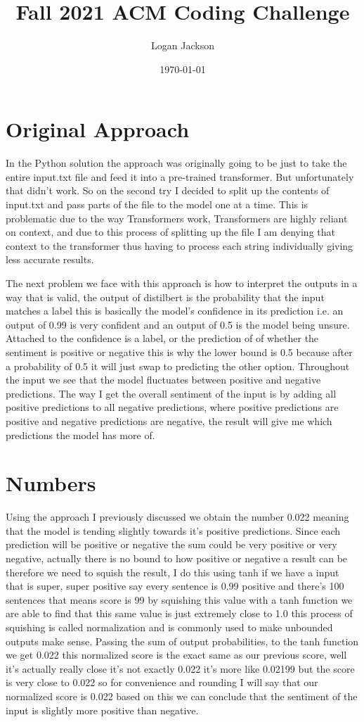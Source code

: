 \documentclass[12pt]{article}
\title{Fall 2021 ACM Coding Challenge}
\author{Logan Jackson}
\date{\today}
\begin{document}
\maketitle{}

\newpage
\section{Original Approach}
In the Python solution the approach was originally going to be just to take the entire input.txt file and feed it into a pre-trained transformer. But unfortunately that didn't work. So on the second try I decided to split up the contents of input.txt and pass parts of the file to the model one at a time. This is problematic due to the way Transformers work, Transformers are highly reliant on context, and due to this process of splitting up the file I am denying that context to the transformer thus having to process each string individually giving less accurate results.

The next problem we face with this approach is how to interpret the outputs in a way that is valid, the output of distilbert is the probability that the input matches a label this is basically the model’s confidence in its prediction i.e. an output of 0.99 is very confident and an output of 0.5 is the model being unsure. Attached to the confidence is a label, or the prediction of of whether the sentiment is positive or negative this is why the lower bound is 0.5 because after a probability of 0.5 it will just swap to predicting the other option. Throughout the input we see that the model fluctuates between positive and negative predictions. The way I get the overall sentiment of the input is by adding all positive predictions to all negative predictions, where positive predictions are positive and negative predictions are negative, the result will give me which predictions the model has more of.

\section{Numbers}
Using the approach I previously discussed we obtain the number 0.022 meaning that the model is tending slightly towards it’s positive predictions. Since each prediction will be positive or negative the sum could be very positive or very negative, actually there is no bound to how positive or negative a result can be therefore we need to squish the result, I do this using tanh if we have a input that is super, super positive say every sentence is 0.99 positive and there’s 100 sentences that means score is 99 by squishing this value with a tanh function we are able to find that this same value is just extremely close to 1.0 this process of squishing is called normalization and is commonly used to make unbounded outputs make sense. Passing the sum of output probabilities, to the tanh function we get 0.022 this normalized score is the exact same as our previous score, well it’s actually really close it’s not exactly 0.022 it’s more like 0.02199 but the score is very close to 0.022 so for convenience and rounding I will say that our normalized score is 0.022 based on this we can conclude that the sentiment of the input is slightly more positive than negative.
\end{document}
